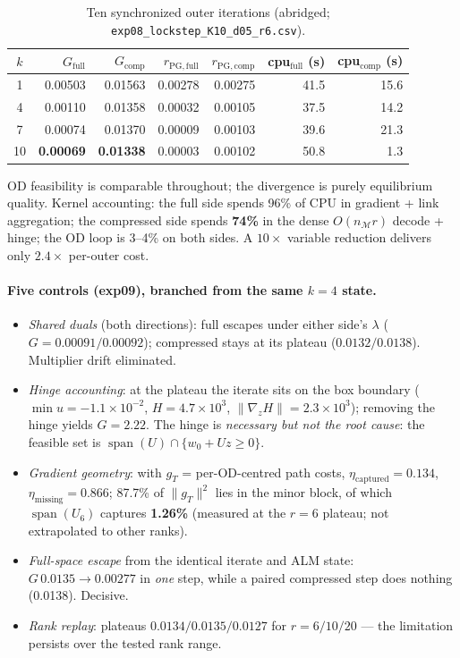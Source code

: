 \documentclass[11pt]{article}
\begin{document}
\begin{table}[h]\centering\small
\caption{Ten synchronized outer iterations (abridged; \texttt{exp08\_lockstep\_K10\_d05\_r6.csv}).}
\begin{tabular}{crrrrrr}
\toprule
$k$ & $G_{\mathrm{full}}$ & $G_{\mathrm{comp}}$ & $r_{\mathrm{PG,full}}$ &
$r_{\mathrm{PG,comp}}$ & cpu$_{\mathrm{full}}$ (s) & cpu$_{\mathrm{comp}}$ (s)\\
\midrule
1  & 0.00503 & 0.01563 & 0.00278 & 0.00275 & 41.5 & 15.6\\
4  & 0.00110 & 0.01358 & 0.00032 & 0.00105 & 37.5 & 14.2\\
7  & 0.00074 & 0.01370 & 0.00009 & 0.00103 & 39.6 & 21.3\\
10 & \textbf{0.00069} & \textbf{0.01338} & 0.00003 & 0.00102 & 50.8 & 1.3\\
\bottomrule
\end{tabular}
\end{table}

\noindent OD feasibility is comparable throughout; the divergence is purely equilibrium
quality. Kernel accounting: the full side spends 96\% of CPU in gradient + link
aggregation; the compressed side spends \textbf{74\%} in the dense
$O(n_{\mathcal M} r)$ decode + hinge; the OD loop is 3--4\% on both sides. A $10\times$
variable reduction delivers only $2.4\times$ per-outer cost.

\paragraph{Five controls (exp09), branched from the same $k{=}4$ state.}
\begin{itemize}\itemsep2pt
\item[C1] \emph{Shared duals} (both directions): full escapes under either side's
$\lambda$ ($G=0.00091/0.00092$); compressed stays at its plateau ($0.0132/0.0138$).
Multiplier drift eliminated.
\item[C2] \emph{Hinge accounting}: at the plateau the iterate sits on the box boundary
($\min u=-1.1\times10^{-2}$, $H=4.7\times10^3$, $\|\nabla_z H\|=2.3\times10^3$);
removing the hinge yields $G=2.22$. The hinge is \emph{necessary but not the root
cause}: the feasible set is $\operatorname{span}(U)\cap\{w_0+Uz\ge0\}$.
\item[C3] \emph{Gradient geometry}: with $g_T$ = per-OD-centred path costs,
$\eta_{\mathrm{captured}}=0.134$, $\eta_{\mathrm{missing}}=0.866$; 87.7\% of
$\|g_T\|^2$ lies in the minor block, of which $\operatorname{span}(U_6)$ captures
\textbf{1.26\%} (measured at the $r{=}6$ plateau; not extrapolated to other ranks).
\item[C4] \emph{Full-space escape} from the identical iterate and ALM state:
$G\,0.0135\to0.00277$ in \emph{one} step, while a paired compressed step does nothing
(0.0138). Decisive.
\item[C5] \emph{Rank replay}: plateaus $0.0134/0.0135/0.0127$ for $r=6/10/20$ --- the
limitation persists over the tested rank range.
\end{itemize}
\end{document}

